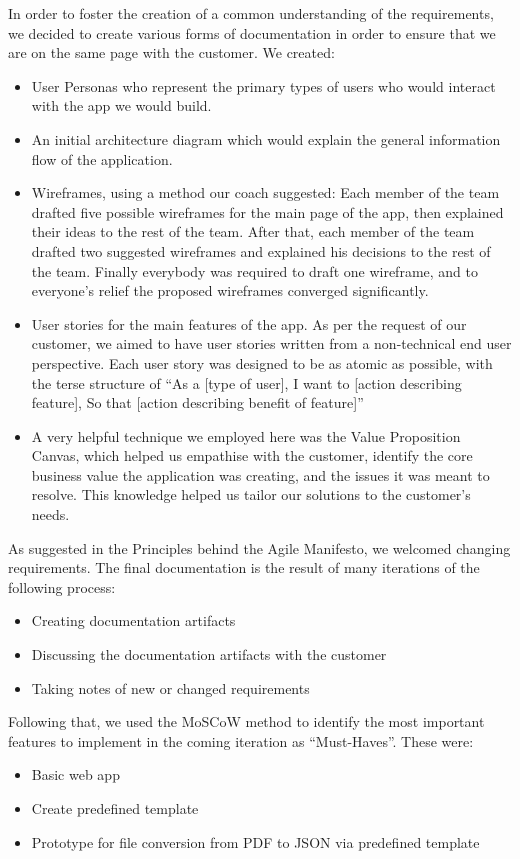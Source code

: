 \documentclass{l3proj}
\begin{document}
In order to foster the creation of a common understanding of the requirements, we decided to create various forms of documentation in order to ensure that we are on the same page with the customer. We created:
\begin{itemize}
\item User Personas who represent the primary types of users who would interact with the app we would build.
\item An initial architecture diagram which would explain the general information flow of the application.
\item Wireframes, using a method our coach suggested: 
Each member of the team drafted five possible wireframes for the main page of the app, then explained their ideas to the rest of the team. After that, each member of the team drafted two suggested wireframes and explained his decisions to the rest of the team.
Finally everybody was required to draft one wireframe, and to everyone’s relief the proposed wireframes converged significantly.
\item User stories for the main features of the app. As per the request of our customer, we aimed to have user stories written from a non-technical end user perspective. Each user story was designed to be as atomic as possible, with the terse structure of ``As a [type of user], I want to [action  describing  feature], So that [action  describing  benefit  of  feature]''
\item A very helpful technique we employed here was the Value Proposition Canvas, which helped us empathise with the customer, identify the core business value the application was creating, and the issues it was meant to resolve. This knowledge helped us tailor our solutions to the customer’s needs.
\end{itemize}

As suggested in the Principles behind the Agile Manifesto, we welcomed changing requirements.
The final documentation is the result of many iterations of the following process:
\begin{itemize}
\item Creating documentation artifacts
\item Discussing the documentation artifacts with the customer
\item Taking notes of new or changed requirements
\end{itemize}

Following that, we used the MoSCoW method to identify the most important features to implement in the coming iteration as ``Must-Haves''. These were: 
\begin{itemize}
\item Basic web app
\item Create predefined template
\item Prototype for file conversion from PDF to JSON via predefined template
\end{itemize}
\end{document}
